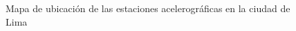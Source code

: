 \documentclass[11pt, a4paper]{report}
\begin{document}
\begin{figure}[!h]
    \centering
            \caption{Mapa de ubicación de las estaciones acelerográficas en la ciudad de Lima}
            \label{fig:fig02}
            \setlength\fboxsep{0pt}
            \setlength\fboxrule{0.3pt}
    
    \end{figure}
    
\end{document}
